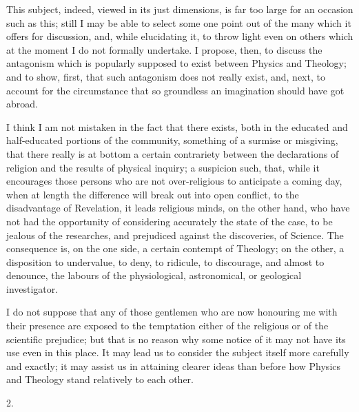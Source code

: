 This subject, indeed, viewed in its just dimensions, is far too
large for an occasion such as this; still I may be able to
select some one point out of the many which it offers for discussion,
and, while elucidating it, to throw light even on others which at the
moment I do not formally undertake. I propose, then, to discuss the
antagonism which is popularly supposed to exist between Physics and
Theology; and to show, first, that such antagonism does not really
exist, and, next, to account for the circumstance that so groundless
an imagination should have got abroad.

I think I am not mistaken in the fact that there exists, both in
the educated and half-educated portions of the community, something of
a surmise or misgiving, that there really is at bottom a certain
contrariety between the declarations of religion and the results of
physical inquiry; a suspicion such, that, while it encourages those
persons who are not over-religious to anticipate a coming day, when at
length the difference will break out into open conflict, to the
disadvantage of Revelation, it leads religious minds, on the other
hand, who have not had the opportunity of considering accurately the
state of the case, to be jealous of the researches, and prejudiced
against the discoveries, of Science. The consequence is, on the one
side, a certain contempt of Theology; on the other, a disposition to
undervalue, to deny, to ridicule, to discourage, and almost to
denounce, the labours of the physiological, astronomical, or
geological investigator.

I do not suppose that any of those gentlemen who are now honouring
me with their presence are exposed to the temptation either of the
religious or of the scientific prejudice; but that is no reason why
some notice of it may not have its use even in this place. It may lead
us to consider the subject itself more carefully and exactly; it may
assist us in attaining clearer ideas than before how Physics and
Theology stand relatively to each other.

2.

